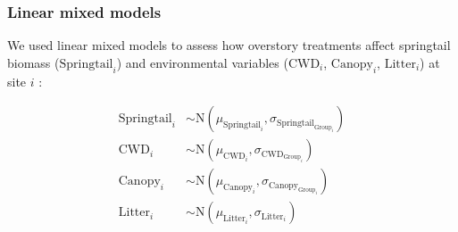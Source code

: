 

\subsubsection{Linear mixed models} 

We used linear mixed models to assess how overstory treatments affect springtail biomass ($\text{Springtail}_{i}$) and 
environmental variables ($\text{CWD}_{i}$, $\text{Canopy}_{i}$, $\text{Litter}_{i}$) at site $i$ :

\begin{align}
  \text{Springtail}_{i} &\sim \text{N} (\mu_{\text{Springtail}_i}, \sigma_{\text{Springtail}_{\text{Group}_i}}) \nonumber \\
  \text{CWD}_{i} &\sim \text{N} (\mu_{\text{CWD}_i}, \sigma_{\text{CWD}_{\text{Group}_i}}) \\
  \text{Canopy}_{i} &\sim \text{N} (\mu_{\text{Canopy}_i}, \sigma_{\text{Canopy}_{\text{Group}_i}}) \nonumber \\
  \text{Litter}_{i} &\sim \text{N} (\mu_{\text{Litter}_i}, \sigma_{\text{Litter}_{i}}) \nonumber 
\end{align}


